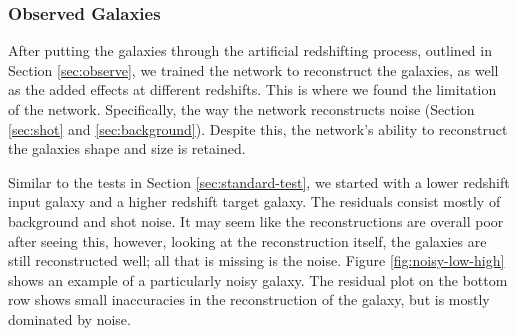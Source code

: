 \documentclass[fleqn,usenatbib]{mnras}
\begin{document}
\subsubsection{Observed Galaxies} \label{sec:observed-test}
After putting the galaxies through the artificial redshifting process, outlined in Section \ref{sec:observe}, we trained the network to reconstruct the galaxies, as well as the added effects at different redshifts. This is where we found the limitation of the network. Specifically, the way the network reconstructs noise (Section \ref{sec:shot} and \ref{sec:background}). Despite this, the network's ability to reconstruct the galaxies shape and size is retained.

Similar to the tests in Section \ref{sec:standard-test}, we started with a lower redshift input galaxy and a higher redshift target galaxy. The residuals consist mostly of background and shot noise. It may seem like the reconstructions are overall poor after seeing this, however, looking at the reconstruction itself, the galaxies are still reconstructed well; all that is missing is the noise. Figure \ref{fig:noisy-low-high} shows an example of a particularly noisy galaxy. The residual plot on the bottom row shows small inaccuracies in the reconstruction of the galaxy, but is mostly dominated by noise.
\end{document}
